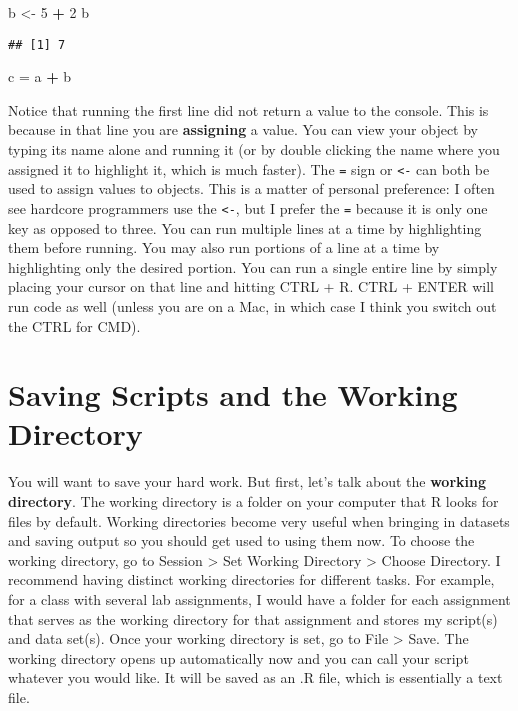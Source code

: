 \documentclass[]{book}
\newenvironment{Shaded}{\begin{snugshade}}{\end{snugshade}}
\newcommand{\DecValTok}[1]{\textcolor[rgb]{0.00,0.00,0.81}{#1}}
\newcommand{\StringTok}[1]{\textcolor[rgb]{0.31,0.60,0.02}{#1}}
\newcommand{\OperatorTok}[1]{\textcolor[rgb]{0.81,0.36,0.00}{\textbf{#1}}}
\newcommand{\NormalTok}[1]{#1}
\theoremstyle{definition}
\theoremstyle{definition}
\theoremstyle{definition}
\theoremstyle{remark}
\begin{document}
\begin{Shaded}
\begin{Highlighting}[]
\NormalTok{b <-}\StringTok{ }\DecValTok{5} \OperatorTok{+}\StringTok{ }\DecValTok{2}
\NormalTok{b}
\end{Highlighting}
\end{Shaded}

\begin{verbatim}
## [1] 7
\end{verbatim}

\begin{Shaded}
\begin{Highlighting}[]
\NormalTok{c =}\StringTok{ }\NormalTok{a }\OperatorTok{+}\StringTok{ }\NormalTok{b}
\end{Highlighting}
\end{Shaded}

Notice that running the first line did not return a value to the
console. This is because in that line you are \textbf{assigning} a
value. You can view your object by typing its name alone and running it
(or by double clicking the name where you assigned it to highlight it,
which is much faster). The \texttt{=} sign or \texttt{\textless{}-} can
both be used to assign values to objects. This is a matter of personal
preference: I often see hardcore programmers use the
\texttt{\textless{}-}, but I prefer the \texttt{=} because it is only
one key as opposed to three. You can run multiple lines at a time by
highlighting them before running. You may also run portions of a line at
a time by highlighting only the desired portion. You can run a single
entire line by simply placing your cursor on that line and hitting CTRL
+ R. CTRL + ENTER will run code as well (unless you are on a Mac, in
which case I think you switch out the CTRL for CMD).

\chapter{Saving Scripts and the Working
Directory}\label{saving-scripts-and-the-working-directory}

You will want to save your hard work. But first, let's talk about the
\textbf{working directory}. The working directory is a folder on your
computer that R looks for files by default. Working directories become
very useful when bringing in datasets and saving output so you should
get used to using them now. To choose the working directory, go to
Session \textgreater{} Set Working Directory \textgreater{} Choose
Directory. I recommend having distinct working directories for different
tasks. For example, for a class with several lab assignments, I would
have a folder for each assignment that serves as the working directory
for that assignment and stores my script(s) and data set(s). Once your
working directory is set, go to File \textgreater{} Save. The working
directory opens up automatically now and you can call your script
whatever you would like. It will be saved as an .R file, which is
essentially a text file.
\end{document}
